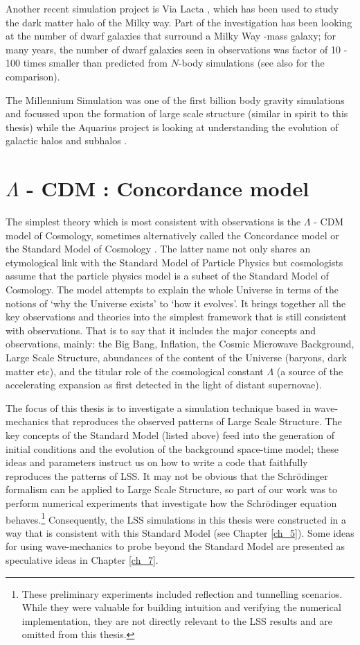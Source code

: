 Another recent simulation project is Via Lacta \citep{bib_via}, which has been used to study the dark matter halo of the Milky way. Part of the investigation has been looking at the number of dwarf galaxies that surround a Milky Way -mass galaxy; for many years, the number of dwarf galaxies seen in observations was factor of 10 - 100 times smaller than predicted from $N$-body simulations (see also \citep{bib_toll} for the comparison).

The Millennium Simulation was one of the first billion body gravity simulations and focussed upon the formation of large scale structure (similar in spirit to this thesis) while the Aquarius project is looking at understanding the evolution of galactic halos and subhalos \citep{bib_aqu2}.


\section{$\Lambda$ - CDM : Concordance model}
The simplest theory which is most consistent with observations is the $\Lambda$ - CDM model of Cosmology, sometimes alternatively called the Concordance model or the Standard Model of Cosmology \citep{bib_lah}. The latter name not only shares an etymological link with the Standard Model of Particle Physics but cosmologists assume that the particle physics model is a subset of the Standard Model of Cosmology. The model attempts to explain the whole Universe in terms of the notions of `why the Universe exists' to `how it evolves'. It brings together all the key observations and theories into the simplest framework that is still consistent with observations. That is to say that it includes the major concepts and observations, mainly: the Big Bang, Inflation, the Cosmic Microwave Background, Large Scale Structure, abundances of the content of the Universe (baryons, dark matter etc), and the titular role of the cosmological constant $\Lambda$ (a source of the accelerating expansion as first detected in the light of distant supernovae).

The focus of this thesis is to investigate a simulation technique based in wave-mechanics that reproduces the observed patterns of Large Scale Structure. The key concepts of the Standard Model (listed above) feed into the generation of initial conditions and the evolution of the background space-time model; these ideas and parameters instruct us on how to write a code that faithfully reproduces the patterns of LSS.  It may not be obvious that the Schr\"odinger formalism can be applied to Large Scale Structure, so part of our work was to perform numerical experiments that investigate how the Schr\"odinger equation behaves.\footnote{These preliminary experiments included reflection and tunnelling scenarios. While they were valuable for building intuition and verifying the numerical implementation, they are not directly relevant to the LSS results and are omitted from this thesis.} Consequently, the LSS simulations in this thesis were constructed in a way that is consistent with this Standard Model (see Chapter \ref{ch_5}). Some ideas for using wave-mechanics to probe beyond the Standard Model are presented as speculative ideas in Chapter \ref{ch_7}.

